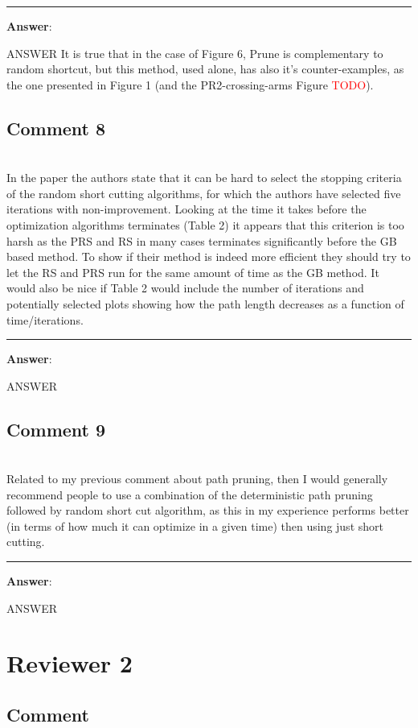 \documentclass{scrartcl}
\newcommand{\todo}{\textcolor{red}{TODO}}
\begin{document}
\rule{\linewidth}{.1pt}
\textbf{Answer}:

ANSWER
It is true that in the case of Figure 6, Prune is complementary to random shortcut, but this method, used alone, has also it's counter-examples, as the one presented in Figure 1 (and the PR2-crossing-arms Figure \todo).

\subsection{Comment 8}
\hrulefill\\

In the paper the authors state that it can be hard to select the stopping criteria of the random short cutting algorithms, for which the authors have selected five iterations with non-improvement. Looking at the time it takes before the optimization algorithms terminates (Table 2) it appears that this criterion is too harsh as the PRS and RS in many cases terminates significantly before the GB based method. To show if their method is indeed more efficient they should try to let the RS and PRS run for the same amount of time as the GB method. It would also be nice if Table 2 would include the number of iterations and potentially selected plots showing how the path length decreases as a function of time/iterations.

\rule{\linewidth}{.1pt}
\textbf{Answer}:

ANSWER

\subsection{Comment 9}
\hrulefill\\

Related to my previous comment about path pruning, then I would generally recommend people to use a combination of the deterministic path pruning followed by random short cut algorithm, as this in my experience performs better (in terms of how much it can optimize in a given time) then using just short cutting.


\rule{\linewidth}{.1pt}
\textbf{Answer}:

ANSWER


\section{Reviewer 2}

\subsection{Comment}
\hrulefill\\
\end{document}

